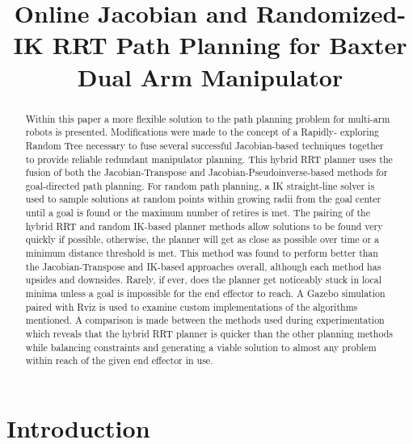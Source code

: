 \documentclass[conference]{IEEEtran} \usepackage[T1]{fontenc} \usepackage[backend=biber, style=ieee]{biblatex}
\begin{document}
\title{Online Jacobian and Randomized-IK RRT Path Planning for Baxter Dual Arm Manipulator}

\author{
}

\maketitle

\begin{abstract}
Within this paper a more flexible solution to the path planning problem for multi-arm robots is presented. Modifications were made to the concept of a Rapidly-
exploring Random Tree necessary to fuse several successful Jacobian-based techniques together to provide reliable redundant manipulator planning. This hybrid 
RRT planner uses the fusion of both the Jacobian-Transpose and Jacobian-Pseudoinverse-based methods for goal-directed path planning. For random path planning, a IK straight-line solver is used to 
sample solutions at random points within growing radii from the goal center until a goal is found or the maximum number of retires is met. The pairing of the 
hybrid RRT and random IK-based planner methods allow solutions to be found very quickly if possible, otherwise, the planner will get as close as possible over 
time or a minimum distance threshold is met. This method was found to perform better than the Jacobian-Transpose and IK-based approaches overall, although each 
method has upsides and downsides. Rarely, if ever, does the planner get noticeably stuck in local minima unless a goal is impossible for the end effector to 
reach. A Gazebo simulation paired with Rviz is used to examine custom implementations of the algorithms mentioned. A comparison is made between the methods used 
during experimentation which reveals that the hybrid RRT planner is quicker than the other planning methods while balancing constraints and generating a viable solution to almost any problem within reach of the given end effector in use.
\end{abstract}

\section{Introduction} \label{Introduction}
\end{document}
